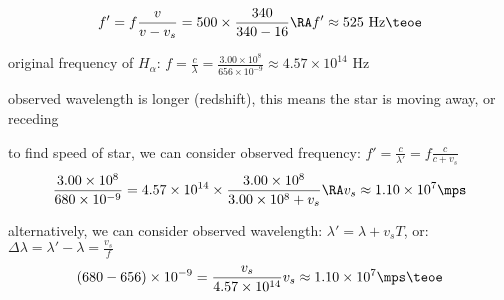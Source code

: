 \solc\begin{equation*}
	f' = f\frac{v}{v - v_s} = 500 \times \frac{340}{340-16} \RA f' \approx 525 \text{ Hz} \teoe
\end{equation*}


\sol original frequency of $H_\alpha$: $f = \frac{c}{\lambda} = \frac{3.00\times10^8}{656 \times 10^{-9}} \approx 4.57 \times 10^{14} \text{ Hz}$

observed wavelength is longer (redshift), this means the star is moving away, or receding

to find speed of star, we can consider observed frequency: $f' = \frac{c}{\lambda'} = f\frac{c}{c + v_s}$
\begin{equation*}
	\frac{3.00\times10^8}{680\times10^{-9}} = 4.57 \times 10^{14} \times \frac{3.00\times10^8}{3.00\times10^8 + v_s} \RA v_s \approx 1.10 \times 10^7 \mps
\end{equation*}
	
alternatively, we can consider observed wavelength: $\lambda' = \lambda + v_s T$, or: $\Delta \lambda = \lambda' - \lambda = \frac{v_s}{f}$
\begin{equation*}
	(680-656)\times10^{-9} = \frac{v_s}{4.57 \times 10^{14}} v_s \approx 1.10 \times 10^7 \mps \teoe
\end{equation*}





